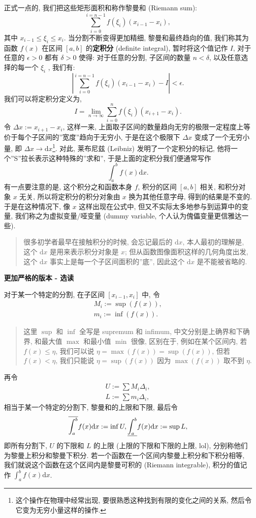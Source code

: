 正式一点的, 我们把这些矩形面积和称作黎曼和 (Riemann sum): \[
\sum_{i=0}^{i=n-1}f(\xi_i)(x_{i-1}-x_i),
\] 其中 \(x_{i-1}\le\xi_i\le x_i\). 当分割不断变得更加精细,
黎曼和最终趋向的值, 我们称其为函数 \(f(x)\) 在区间 \([a,b]\)
的\textbf{定积分} (definite integral), 暂时将这个值记作 \(I\),
对于任意的 \(\epsilon>0\) 都有 \(\delta>0\) 使得: 对于任意的分割,
子区间的数量 \(n<\delta\), 以及任意选择的每一个 \(\xi_i\) , 我们有: \[
\left|\sum_{i=0}^{i=n-1}f(\xi_i)(x_{i-1}-x_i)-I\right|<\epsilon.
\] 我们可以将定积分定义为, \[
\boxed{I=\lim_{n\rightarrow\infty}\sum_{i=0}^nf(\xi_i)(x_{i+1}-x_i).}
\] 令 \(\Delta x:=x_{i+1}-x_i\), 这样一来,
上面取子区间的数量趋向无穷的极限一定程度上等价于每个子区间的''宽度''趋向于无穷小,
于是在这个极限下 \(\Delta x\) 变成了一个无穷小量, 即
\(\Delta x\rightarrow \mathrm{d}x\)\footnote{这个操作在物理中经常出现,
  要很熟悉这种找到有限的变化之间的关系, 然后令它变为无穷小量这样的操作.}.
对此, 莱布尼兹 (Leibniz) 发明了一个定积分的标记,
他将一个''S''拉长表示这种特殊的''求和'', 于是上面的定积分我们便通常写作
\[
\boxed{\int_a^bf(x)\mathrm{d}x.}
\] 有一点要注意的是, 这个积分之和函数本身 \(f\), 积分的区间 \([a,b]\)
相关, 和积分对象 \(x\) 无关, 所以将定积分的积分对象由 \(x\)
换为其他任意字母, 得到的结果是不变的. 于是在这种情况下, 像 \(x\)
这样出现在公式中, 但又不实际太多地参与到运算中的变量,
我们称之为虚拟变量/哑变量 (dummy variable,
个人认为傀儡变量更信雅达一些).

\begin{quote}
很多初学者最早在接触积分的时候, 会忘记最后的 \(\mathrm{d}x\),
本人最初的理解是, 这个 \(\mathrm{d}x\) 是用来表示积分对象是 \(x\);
但从函数图像面积这样的几何角度出发, 这个 \(\mathrm{d}x\)
事实上是每一个子区间面积的''底'', 因此这个 \(\mathrm{d}x\)
是不能被省略的.
\end{quote}

\textbf{更加严格的版本 - 选读}

对于某一个特定的分割, 在子区间 \([x_{i-1},x_i]\) 中, 令 \[
\begin{gather*}
M_i:=\sup \left(f(x)\right),\\
m_i:=\inf \left(f(x)\right).
\end{gather*}
\]

\begin{quote}
这里 \(\sup\) 和 \(\inf\) 全写是 supremum 和 infimum,
中文分别是上确界和下确界, 和最大值 \(\max\) 和最小值 \(\min\) 很像,
区别在于, 例如在某个区间内, 若 \(f(x)\le \eta\), 我们可以说
\(\eta=\max \left(f(x)\right)=\sup \left(f(x)\right)\), 但若
\(f(x)<\eta\), 我们只能说 \(\eta=\sup \left(f(x)\right)\) 因为
\(\max \left(f(x)\right)\) 取不到 \(\eta\).
\end{quote}

再令 \[
\begin{gather*}
U:=\sum M_i\Delta_i,\\
L:=\sum m_i\Delta_i,
\end{gather*}
\] 相当于某一个特定的分割下, 黎曼和的上限和下限, 最后令 \[
\overline{\int_a^b}f(x)\mathrm{d}x:=\inf U,\\
\underline{\int_a^b}f(x)\mathrm{d}x:=\sup L,
\] 即所有分割下, \(U\) 的下限和 \(L\) 的上限 (上限的下限和下限的上限,
lol), 分别称他们为黎曼上积分和黎曼下积分.
若一个函数在一个区间内黎曼上积分和下积分相等,
我们就说这个函数在这个区间内是黎曼可积的 (Riemann integrable),
积分的值记作 \(\int_a^bf(x)\mathrm{d}x\).
